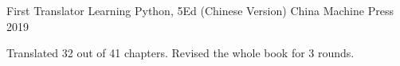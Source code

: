 


\begin{cventries}


\cventry
{First Translator} %
{Learning Python, 5Ed (Chinese Version)} %
{China Machine Press} %
{2019} %
{ %
\begin{cvitems}
\item {Translated 32 out of 41 chapters. Revised the whole book for 3 rounds.}
\end{cvitems}
}

\end{cventries}
